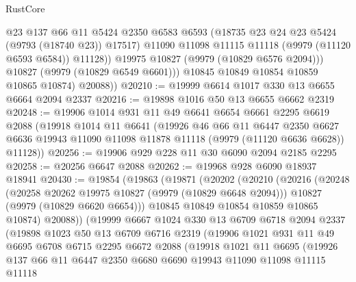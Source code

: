 \begin{lexlean}{RustCore}
\begin{coremodule}
                  @23
                  @137
                  @66
                  @11
                  @5424
                  @2350
                  @6583
                  @6593
                  (@18735 @23 @24 @23 @5424 (@9793 (@18740 @23)) @17517)
                  @11090
                  @11098
                  @11115
                  @11118
                  (@9979 (@11120 @6593 @6584))
                  @11128))
              @19975
              @10827
              (@9979 (@10829 @6576 @2094)))
            @10827
            (@9979 (@10829 @6549 @6601)))
          @10845
          @10849
          @10854
          @10859
          @10865
          @10874)
        @20088))
@20210 := @19999 @6614 @1017 @330 @13 @6655 @6664 @2094 @2337
@20216 := @19898 @1016 @50 @13 @6655 @6662 @2319
@20248 := @19906
    @1014
    @931
    @11
    @49
    @6641
    @6654
    @6661
    @2295
    @6619
    @2088
    (@19918
      @1014
      @11
      @6641
      (@19926
        @46
        @66
        @11
        @6447
        @2350
        @6627
        @6636
        @19943
        @11090
        @11098
        @11878
        @11118
        (@9979 (@11120 @6636 @6628))
        @11128))
@20256 := @19906 @929 @228 @11 @30 @6090 @2094 @2185 @2295
@20258 := @20256 @6647 @2088
@20262 := @19968 @928 @6090 @18937 @18941
@20430 := @19854
    (@19863
      (@19871
        (@20202
          (@20210
            (@20216
              (@20248
                (@20258 @20262 @19975 @10827 (@9979 (@10829 @6648 @2094)))
                @10827
                (@9979 (@10829 @6620 @6654)))
              @10845
              @10849
              @10854
              @10859
              @10865
              @10874)
            @20088))
        (@19999
          @6667
          @1024
          @330
          @13
          @6709
          @6718
          @2094
          @2337
          (@19898
            @1023
            @50
            @13
            @6709
            @6716
            @2319
            (@19906
              @1021
              @931
              @11
              @49
              @6695
              @6708
              @6715
              @2295
              @6672
              @2088
              (@19918
                @1021
                @11
                @6695
                (@19926
                  @137
                  @66
                  @11
                  @6447
                  @2350
                  @6680
                  @6690
                  @19943
                  @11090
                  @11098
                  @11115
                  @11118

\end{coremodule}
\end{lexlean}
